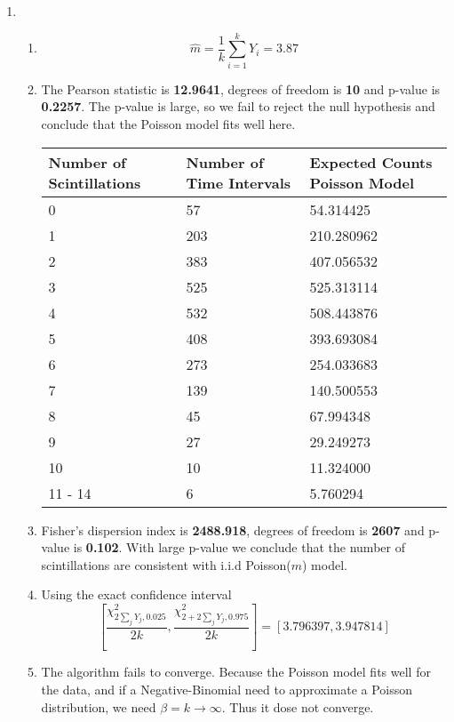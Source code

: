 \documentclass{article}
\begin{document}
\begin{enumerate}[leftmargin = 0 em, label = \arabic*., font = \bfseries]
\begin{enumerate}
	\end{enumerate}

	\item 
	\begin{enumerate}
		\item 
		\[\hat{m} = \frac{1}{k} \sum_{i=1}^k Y_{i} = 3.87\]

		\item The Pearson statistic is \textbf{12.9641}, degrees of freedom is \textbf{10} and p-value is \textbf{0.2257}. The p-value is large, so we fail to reject the null hypothesis and conclude that the Poisson model fits well here. 
		\begin{center}
			\begin{tabularx}{0.8\textwidth}{XXX}
			\toprule
			\textbf{Number of Scintillations} & \textbf{Number of Time Intervals}&\textbf{Expected Counts Poisson Model}\\
			\midrule
	     0&   57&  54.314425\\
         1&  203& 210.280962\\
         2&  383& 407.056532\\
         3&  525& 525.313114\\
         4&  532& 508.443876\\
         5&  408& 393.693084\\
         6&  273& 254.033683\\
         7&  139& 140.500553\\
         8&   45&  67.994348\\
         9&   27&  29.249273\\
        10&   10&  11.324000\\
        11 - 14&    6&   5.760294\\
        \bottomrule
			\end{tabularx}
		\end{center}

		\item 
		Fisher's dispersion index is \textbf{2488.918}, degrees of freedom is \textbf{2607} and p-value is \textbf{0.102}. With large p-value we conclude that the number of scintillations are consistent with i.i.d Poisson($m$) model.

		\item Using the exact confidence interval
		\[\left[\frac{\chi_{2 \sum_{j}Y_j, 0.025}^2}{2k} , \frac{\chi_{2 + 2 \sum_{j} Y_j, 0.975}^2}{2k}\right] = [3.796397 , 3.947814]\]

		\item 
		The algorithm fails to converge. Because the Poisson model fits well for the data, and if a Negative-Binomial need to approximate a Poisson distribution, we need $\beta = k\to \infty$. Thus it dose not converge.


\end{enumerate}
\end{enumerate}
\end{document}
